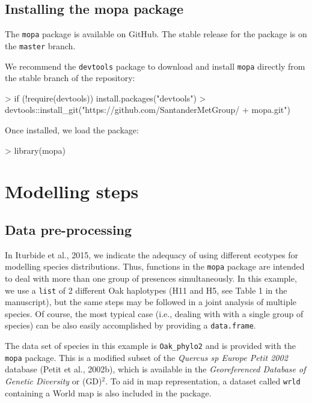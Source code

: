 \documentclass[10pt,a4paper]{article}
\begin{document}
\subsection{Installing the mopa package}

The \texttt{mopa} package is available on GitHub. The stable release for the package is on the \texttt{master} branch. 

We recommend the \texttt{devtools} package to download and install \texttt{mopa} directly from the stable branch of the repository:

\begin{Schunk}
\begin{Sinput}
> if (!require(devtools)) install.packages("devtools")
> devtools::install_git("https://github.com/SantanderMetGroup/
+                       mopa.git")
\end{Sinput}
\end{Schunk}

Once installed, we load the package:

\begin{Schunk}
\begin{Sinput}
> library(mopa)
\end{Sinput}
\end{Schunk}

\section{Modelling steps}
\subsection{Data pre-processing}

In Iturbide et al., 2015, we indicate the adequacy of using different ecotypes for modelling species distributions. Thus, functions in the \texttt{mopa} package are intended to deal with more than one group of presences simultaneously. In this example, we use a \texttt{list} of 2 different Oak haplotypes (H11 and H5, see Table 1 in the manuscript), but the same steps may be followed in a joint analysis of multiple species. Of course, the most typical case (i.e., dealing with with a single group of species) can be also easily accomplished by providing a \texttt{data.frame}. 

The data set of species in this example is \texttt{Oak\_phylo2} and is provided with the \texttt{mopa} package. This is a modified subset of the \textit{Quercus sp Europe Petit 2002} database (Petit et al., 2002b), which is available in the \textit{Georeferenced Database of Genetic Diversity} or (GD)$^{2}$. To aid in map representation, a dataset called \texttt{wrld} containing a World map is also included in the package.
\end{document}
